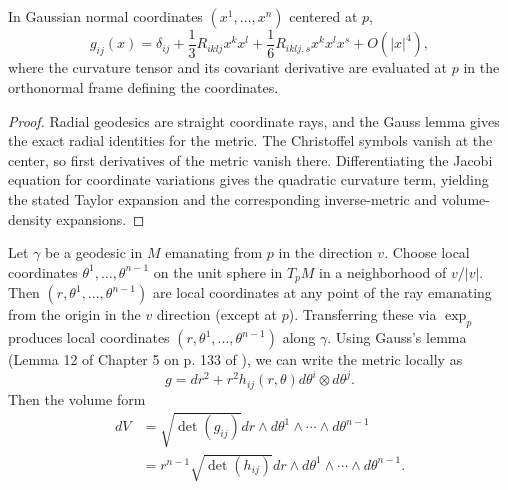 \begin{lemma}
\label{lem:normal-coordinates-expansion}

In Gaussian normal coordinates $(x^1,\ldots,x^n)$ centered at $p$,
$$g_{ij}(x)=\delta_{ij}+\frac13R_{iklj}x^kx^l
+\frac16R_{iklj,s}x^kx^lx^s+O(|x|^4),$$
where the curvature tensor and its covariant derivative are
evaluated at $p$ in the orthonormal frame defining the coordinates.
\end{lemma}

\begin{proof}
\sketch
{}
Radial geodesics are straight coordinate rays, and the Gauss lemma gives the exact radial identities for the metric. The Christoffel symbols vanish at the center, so first derivatives of the metric vanish there. Differentiating the Jacobi equation for coordinate variations gives the quadratic curvature term, yielding the stated Taylor expansion and the corresponding inverse-metric and volume-density expansions.
\end{proof}

Let $\gamma$ be a geodesic in $M$ emanating from $p$ in the direction $v$.
Choose local coordinates $\theta^1,\ldots,\theta^{n-1}$ on the unit sphere in
$T_pM$ in a neighborhood of $v/|v|$. Then $(r, \theta^{1}, ... ,\theta^{n-1})$
are local coordinates at any point of the ray emanating from the origin in the
$v$ direction (except at $p$). Transferring these via $\exp_p$ produces
local coordinates $(r,\theta^{1}, ... ,\theta^{n-1})$ along $\gamma$. Using
Gauss's lemma (Lemma 12 of Chapter 5 on p. 133 of \cite{Petersen}), we can
write the metric locally as
\[ g=dr^{2}+
r^{2}h_{ij}(r,\theta)d\theta^{i}\otimes d\theta^{j}. \] Then the
volume form
\begin{align*}
dV &= \sqrt{\det(g_{ij})}dr\wedge d\theta^{1}
\wedge\cdots\wedge
d\theta^{n-1}\\
& = r^{n-1}\sqrt{\det(h_{ij})}dr\wedge d\theta^{1}
\wedge\cdots\wedge d\theta^{n-1}.
\end{align*}



